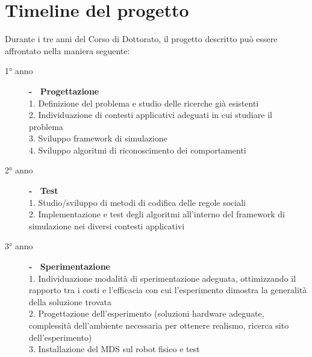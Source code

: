 \documentclass[paper=a4, fontsize=11pt]{scrartcl} %
\numberwithin{equation}{section} %
\numberwithin{table}{section} %
\begin{document}
\section{Timeline del progetto}
Durante i tre anni del Corso di Dottorato, il progetto descritto può
essere affrontato nella maniera seguente:
\begin{description}
\item[1° anno]\textbf{- \ Progettazione} \ \\
	1. Definizione del problema e studio delle ricerche già esistenti \\
	2. Individuazione di contesti applicativi adeguati in cui studiare il problema\\
	3. Sviluppo framework di simulazione\\
	4. Sviluppo algoritmi di riconoscimento dei comportamenti
\item[2° anno]\textbf{- \ Test} \ \\
	1. Studio/sviluppo di metodi di codifica delle regole sociali \\
	2. Implementazione e test degli algoritmi all'interno del framework
		di simulazione nei diversi contesti applicativi
\item[3° anno]\textbf{- \ Sperimentazione} \ \\
	1. Individuazione modalità di sperimentazione adeguata, ottimizzando 
	il rapporto tra i costi e l'efficacia con cui l'esperimento dimostra la generalità della soluzione trovata\\
	2. Progettazione dell'esperimento (soluzioni hardware adeguate,
	 complessità dell'ambiente necessaria per ottenere realismo, 
	 ricerca sito dell'esperimento)\\
	3. Installazione del MDS sul robot fisico e test
	 
\end{description}


\end{document}
